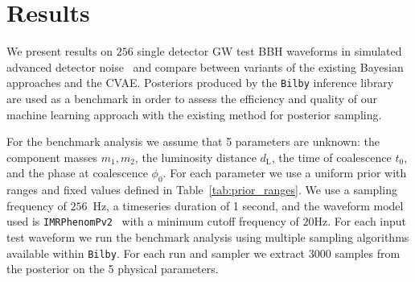 %
%

%
%
%
%
\section{Results}
We present results on $256$ single detector \ac{GW} test \ac{BBH} waveforms in
simulated advanced detector noise~\cite{aligo_noisecurves} and compare between
variants of the existing Bayesian approaches and the \ac{CVAE}. Posteriors
produced by the \texttt{Bilby} inference library~\cite{1811.02042} are used as
a benchmark in order to assess the efficiency and quality of our machine
learning approach with the existing method for posterior sampling.

%
%
For the benchmark analysis we assume that 5 parameters are unknown: the
component masses $m_1,m_2$, the luminosity distance $d_{\text{L}}$, the time of
coalescence $t_{0}$, and the phase at coalescence $\phi_0$. For each
parameter we use a uniform prior with ranges and fixed values defined in
Table~\ref{tab:prior_ranges}.
We use a sampling frequency of $256$~Hz, a timeseries duration of 1 second, and 
the waveform model used is \texttt{IMRPhenomPv2}~\cite{1809.10113} with a
minimum cutoff frequency of $20$Hz. For each input test waveform we run the
benchmark analysis using multiple sampling algorithms available within
\texttt{Bilby}. For each run and sampler we extract $3000$ samples from the
posterior on the 5 physical parameters.  

